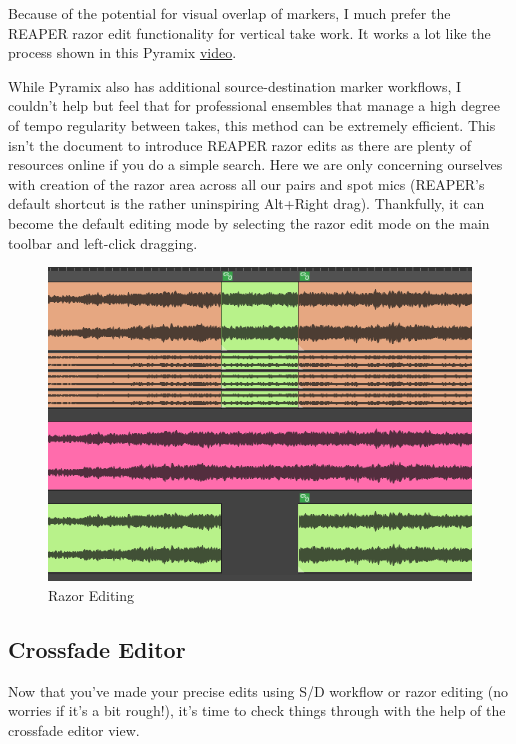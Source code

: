 \documentclass[10pt,american]{article}
\begin{document}
Because of the potential for visual overlap of markers, I much prefer the REAPER
razor edit functionality for vertical take work. It works a lot like the process
shown in this Pyramix \href{https://www.youtube.com/watch?v=wQXwnvITQCQ}{video}.

While Pyramix also has additional source-destination marker workflows, I
couldn't help but feel that for professional ensembles that manage a high degree
of tempo regularity between takes, this method can be extremely efficient. This
isn't the document to introduce REAPER razor edits as there are plenty of
resources online if you do a simple search. Here we are only concerning
ourselves with creation of the razor area across all our pairs and spot mics
(REAPER's default shortcut is the rather uninspiring Alt+Right drag).
Thankfully, it can become the default editing mode by selecting the razor edit
mode on the main toolbar and left-click dragging. 

\begin{figure}
\includegraphics[width=1\linewidth]{user_guide_images/razor}

\caption{Razor Editing}

\end{figure}


\subsection{Crossfade Editor}

Now that you've made your precise edits using S/D workflow or razor editing (no
worries if it's a bit rough!), it's time to check things through with the help
of the crossfade editor view.
\end{document}

